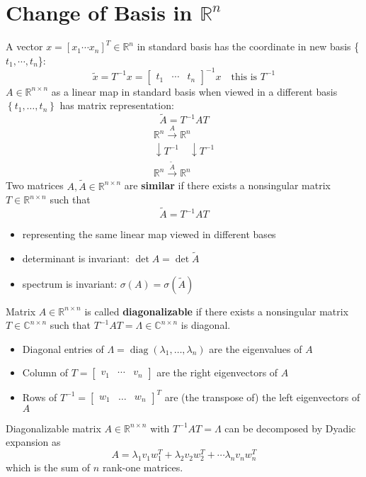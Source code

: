 \documentclass[10pt,a4paper,oneside]{article}
\begin{document}
\section{Change of Basis in $\mathbb{R}^n$}
A vector $x=[x_1\cdots x_n]^T\in \mathbb{R}^n$ in standard basis has the coordinate in new basis \{$t_1,\cdots,t_n$\}:
\[
\tilde{x}=T^{-1} x=\left[\begin{array}{lll}{t_{1}} & {\cdots} & {t_{n}}\end{array}\right]^{-1} x \quad \text{this is $T^{-1}$}
\]
$A \in \mathbb{R}^{n \times n}$ as a linear map in standard basis when viewed in a different
basis $\left\{t_{1}, \ldots, t_{n}\right\}$ has matrix representation:
\[
\tilde{A}=T^{-1} A T
\]
\[
\begin{array}{l}{\mathbb{R}^{n} \stackrel{A}{\longrightarrow} \mathbb{R}^{n}} \\ {\downarrow T^{-1} \quad\downarrow T^{-1}} \\ {\mathbb{R}^{n} \stackrel{\tilde{A}}{\longrightarrow} \mathbb{R}^{n}}\end{array}
\]
Two matrices $A, \tilde{A} \in \mathbb{R}^{n \times n}$ are {\bfseries similar} if there exists a nonsingular matrix $T \in \mathbb{R}^{n \times n}$ such that
\[
\tilde{A}=T^{-1} A T
\]
\begin{itemize}
\item representing the same linear map viewed in different bases
\item determinant is invariant: $\det A=\det \tilde{A}$
\item spectrum is invariant: $\sigma(A)=\sigma(\tilde{A})$
\end{itemize}
Matrix $A\in\mathbb{R}^{n\times n}$ is called \textbf{diagonalizable} if there exists a nonsingular matrix $T\in\mathbb{C}^{n\times n}$ such that $T^{-1}AT=\Lambda\in\mathbb{C}^{n\times n}$ is diagonal.
\begin{itemize}
\item Diagonal entries of $\Lambda=\operatorname{diag}\left(\lambda_{1}, \ldots, \lambda_{n}\right)$ are the eigenvalues of $A$
\item Column of $T=\left[\begin{array}{ccc}{v_{1}} & {\cdots} & {v_{n}}\end{array}\right]$ are the right eigenvectors of $A$
\item Rows of $T^{-1}=\left[\begin{array}{ccc}{w_{1}} & {\dots} & {w_{n}}\end{array}\right]^{T}$ are (the transpose of) the left
eigenvectors of $A$
\end{itemize}
Diagonalizable matrix $A \in \mathbb{R}^{n \times n}$ with $T^{-1} A T=\Lambda$ can be decomposed by Dyadic expansion as
\[
A=\lambda_{1} v_{1} w_{1}^{T}+\lambda_{2} v_{2} w_{2}^{T}+\cdots \lambda_{n} v_{n} w_{n}^{T}
\]
which is the sum of $n$ rank-one matrices.
\end{document}
